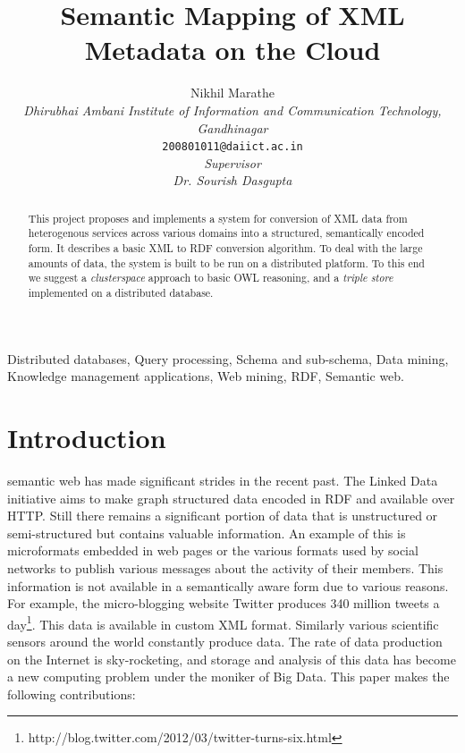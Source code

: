 \documentclass[journal]{IEEEtran}
\begin{document}
%
\title{Semantic Mapping of XML Metadata on the Cloud}
%
\author{Nikhil Marathe\\
    \emph{Dhirubhai Ambani Institute of Information and Communication Technology, Gandhinagar}\\
    \texttt{200801011@daiict.ac.in}\\
    \emph{Supervisor}\\
    \emph{Dr. Sourish Dasgupta}\\
}%
%

\maketitle
{}


\begin{abstract}
    This project proposes and implements a system for conversion of XML data
    from heterogenous services across various domains into a structured,
    semantically encoded form. It describes a basic XML to RDF conversion
    algorithm. To deal with the large amounts of data, the system is built to
    be run on a distributed platform. To this end we suggest
    a \emph{clusterspace} approach to basic OWL reasoning, and a \emph{triple
    store} implemented on a distributed database.
\end{abstract}

\begin{IEEEkeywords}
    Distributed databases, Query processing, Schema and sub-schema, Data
    mining, Knowledge management applications, Web mining, RDF, Semantic web.
\end{IEEEkeywords}

\section{Introduction}
 semantic web has made significant strides in the recent
past. The Linked Data initiative aims to make graph structured data encoded in
RDF and available over HTTP. Still there remains a significant portion of data
that is unstructured or semi-structured but contains valuable information. An
example of this is microformats\cite{Khare:06} embedded in web pages or the
various formats used by social networks to publish various messages about the
activity of their members. This information is not available in a semantically
aware form due to various reasons. For example, the micro-blogging website
Twitter produces
340 million tweets
a day\footnote{http://blog.twitter.com/2012/03/twitter-turns-six.html}.
This data is available in custom XML format. Similarly various scientific
sensors around the world constantly produce data. The rate of data
production on the Internet is sky-rocketing, and storage and analysis of
this data has become a new computing problem under the moniker of Big Data.
This paper makes the following contributions:
\end{document}

